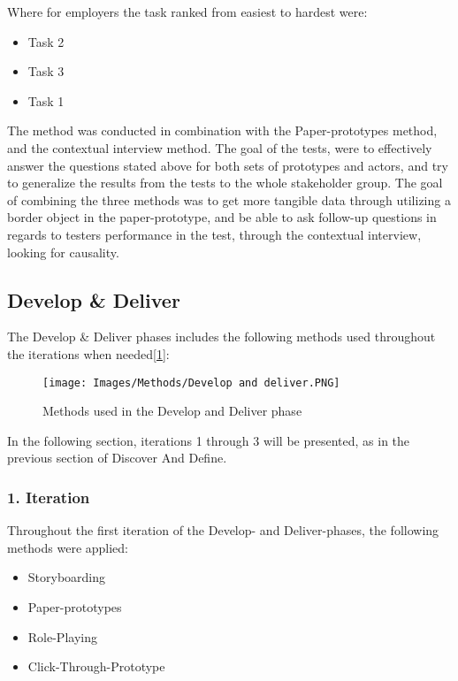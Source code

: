 Where for employers the task ranked from easiest to hardest were:

\begin{itemize}
    \item Task 2
    \item Task 3
    \item Task 1
\end{itemize}

The method was conducted in combination with the Paper-prototypes method, and the contextual interview method. The goal of the tests, were to effectively answer the questions stated above for both sets of prototypes and actors, and try to generalize the results from the tests to the whole stakeholder group. The goal of combining the three methods was to get more tangible data through utilizing a border object in the paper-prototype, and be able to ask follow-up questions in regards to testers performance in the test, through the contextual interview, looking for causality.


\subsection{Develop \& Deliver}
The Develop \& Deliver phases includes the following methods used throughout the iterations when needed[\ref{DevelopandDeliver}]: 

\begin{figure}[H]
\caption{Methods used in the Develop and Deliver phase}
\centering
\label{DevelopandDeliver}
\texttt{[image: Images/Methods/Develop and deliver.PNG]}
\end{figure}

In the following section, iterations 1 through 3 will be presented, as in the previous section of Discover And Define.

\newpage
\subsubsection{1. Iteration}

Throughout the first iteration of the Develop- and Deliver-phases, the following methods were applied:
\begin{itemize}
    \item Storyboarding
    \item Paper-prototypes
    \item Role-Playing
    \item Click-Through-Prototype
\end{itemize}

